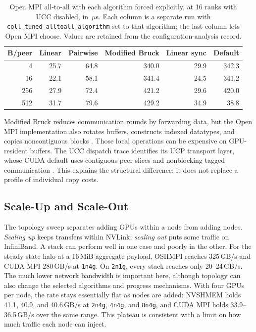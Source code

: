 \begin{table}[htbp]
\centering
\caption[Open MPI all-to-all with forced algorithms]{Open MPI all-to-all with each algorithm forced explicitly, at 16 ranks with UCC disabled, in \,$\mu$s. Each column is a separate run with \texttt{coll\_tuned\_alltoall\_algorithm} set to that algorithm; the last column lets Open MPI choose. Values are retained from the configuration-analysis record.}
\label{tab:m-alltoall-forced}
\scriptsize
\begin{tabular}{rrrrrr}
\toprule
B/peer & Linear & Pairwise & Modified Bruck & Linear sync & Default\\
\midrule
4 & 25.7 & 64.8 & 340.0 & 29.9 & 342.3\\
16 & 22.1 & 58.1 & 341.4 & 24.5 & 341.2\\
256 & 27.9 & 72.4 & 421.2 & 29.6 & 420.0\\
512 & 31.7 & 79.6 & 429.2 & 34.9 & 38.8\\
\bottomrule
\end{tabular}
\end{table}

Modified Bruck reduces communication rounds by forwarding data, but the Open MPI implementation also rotates buffers, constructs indexed datatypes, and copies noncontiguous blocks \cite{bruck_alltoall_1997,openmpi_alltoall_source_2026}. Those local operations can be expensive on GPU-resident buffers. The UCC dispatch trace identifies its UCP transport layer, whose CUDA default uses contiguous peer slices and nonblocking tagged communication \cite{venkata_ucc_2024,openucx_ucc_source_2026}. This explains the structural difference; it does not replace a profile of individual copy costs.

\subsection{Scale-Up and Scale-Out}\label{sec:micro-scaling}

The topology sweep separates adding GPUs within a node from adding nodes. \emph{Scaling up} keeps transfers within NVLink; \emph{scaling out} puts some traffic on InfiniBand. A stack can perform well in one case and poorly in the other. For the steady-state halo at a 16\,MiB aggregate payload, OSHMPI reaches 325\,GB/s and CUDA MPI 280\,GB/s at \texttt{1n4g}. On \texttt{2n1g}, every stack reaches only 20--24\,GB/s. The much lower network bandwidth is important here, although topology can also change the selected algorithms and progress mechanisms. With four GPUs per node, the rate stays essentially flat as nodes are added: NVSHMEM holds 41.1, 40.9, and 40.6\,GB/s at \texttt{2n4g}, \texttt{4n4g}, and \texttt{8n4g}, and CUDA MPI holds 33.9--36.5\,GB/s over the same range. This plateau is consistent with a limit on how much traffic each node can inject.

